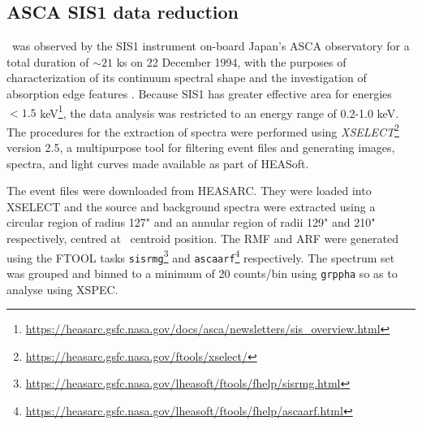     \subsection{ASCA SIS1 data reduction}
    	\source\ was observed by the SIS1 instrument on-board Japan's ASCA observatory for a total duration of $\sim 21$ ks on 22 December 1994, with the purposes of characterization of its continuum spectral shape and the investigation of absorption edge features \cite{ebisawaAsca2001ApJ}. Because SIS1 has greater effective area for energies $<1.5$ keV\footnote{\url{https://heasarc.gsfc.nasa.gov/docs/asca/newsletters/sis_overview.html}}, the data analysis was restricted to an energy range of 0.2-1.0 keV. The procedures for the extraction of spectra were performed using \textit{XSELECT}\footnote{\url{https://heasarc.gsfc.nasa.gov/ftools/xselect/}} version 2.5, a multipurpose tool for filtering event files and generating images, spectra, and light curves made available as part of HEASoft.
    	
    	The event files were downloaded from HEASARC. They were loaded into XSELECT and the source and background spectra were extracted using a circular region of radius 127" and an annular region of radii 129" and 210" respectively, centred at \source\ centroid position. The RMF and ARF were generated using the FTOOL tasks \texttt{sisrmg}\footnote{\url{https://heasarc.gsfc.nasa.gov/lheasoft/ftools/fhelp/sisrmg.html}} and \texttt{ascaarf}\footnote{\url{https://heasarc.gsfc.nasa.gov/lheasoft/ftools/fhelp/ascaarf.html}} respectively. The spectrum set was grouped and binned to a minimum of 20 counts/bin using \texttt{grppha} so as to analyse using XSPEC.
    
